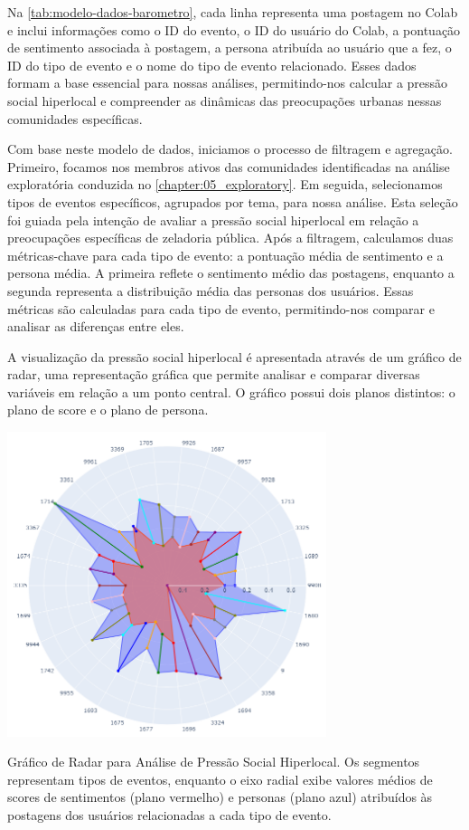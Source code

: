 Na \autoref{tab:modelo-dados-barometro}, cada linha representa uma postagem no Colab e inclui informações como o ID do evento, o ID do usuário do Colab, a pontuação de sentimento associada à postagem, a persona atribuída ao usuário que a fez, o ID do tipo de evento e o nome do tipo de evento relacionado. Esses dados formam a base essencial para nossas análises, permitindo-nos calcular a pressão social hiperlocal e compreender as dinâmicas das preocupações urbanas nessas comunidades específicas.

Com base neste modelo de dados, iniciamos o processo de filtragem e agregação. Primeiro, focamos nos membros ativos das comunidades identificadas na análise exploratória conduzida no \autoref{chapter:05_exploratory}. Em seguida, selecionamos tipos de eventos específicos, agrupados por tema, para nossa análise. Esta seleção foi guiada pela intenção de avaliar a pressão social hiperlocal em relação a preocupações específicas de zeladoria pública. Após a filtragem, calculamos duas métricas-chave para cada tipo de evento: a pontuação média de sentimento e a persona média. A primeira reflete o sentimento médio das postagens, enquanto a segunda representa a distribuição média das personas dos usuários. Essas métricas são calculadas para cada tipo de evento, permitindo-nos comparar e analisar as diferenças entre eles.

A visualização da pressão social hiperlocal é apresentada através de um gráfico de radar, uma representação gráfica que permite analisar e comparar diversas variáveis em relação a um ponto central. O gráfico possui dois planos distintos: o plano de score e o plano de persona.

\begin{quadro}[htb]
	\centering
	\includegraphics[width=0.7\textwidth]{images/social_barometer_plot.png}
	\caption{Gráfico de Radar para Análise de Pressão Social Hiperlocal. Os segmentos representam tipos de eventos, enquanto o eixo radial exibe valores médios de scores de sentimentos (plano vermelho) e personas (plano azul) atribuídos às postagens dos usuários relacionadas a cada tipo de evento.}
	\label{fig:social_barometer_plot}
\end{quadro}

